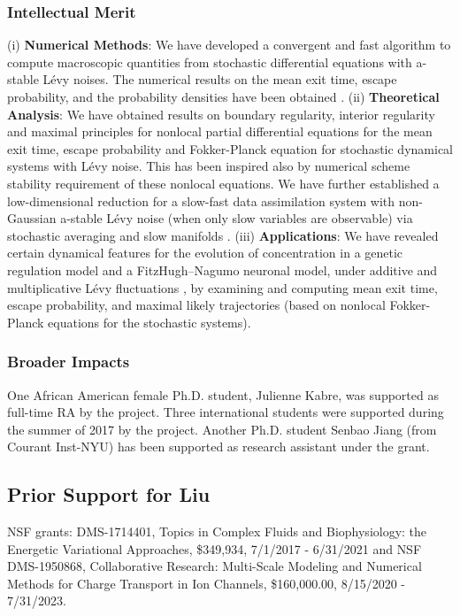 \documentclass[11pt]{NSFamsart}
\begin{document}
\subsubsection*{Intellectual Merit}
(i)  \textbf{Numerical Methods}:
    We have developed a convergent and fast algorithm to compute macroscopic quantities from stochastic differential equations  with a-stable L\'evy noises. The numerical results on the mean   exit time, escape probability,  and the probability densities have been obtained \cite{ChenXL2020, GaoTing2016, Gao2016,     Wang2018NumericalAF}.
(ii)  \textbf{Theoretical Analysis}:
We have obtained results on  boundary regularity, interior regularity and maximal principles for   nonlocal partial differential equations for the mean   exit time,   escape probability and Fokker-Planck equation for stochastic dynamical systems with L\'evy noise. This has been inspired also by numerical scheme stability requirement of these nonlocal equations. We have further established a  low-dimensional reduction for a slow-fast data assimilation system with non-Gaussian a-stable L\'evy noise (when only slow variables are observable) via stochastic averaging and slow manifolds \cite{Lv2016OnAS,QiaoDuan2018,   ZhangZhuanDuan,ZhengDuan2017,ZhengYY2020}.
(iii)   \textbf{Applications}:
   We have revealed certain  dynamical features  for  the evolution of concentration in a genetic regulation model \cite{ChenWu} and a
   FitzHugh–Nagumo   neuronal model,   under additive and multiplicative     L\'evy fluctuations \cite{Liu2019LvyNI}, by examining and computing mean exit time, escape probability, and maximal likely trajectories (based on nonlocal Fokker-Planck equations for the stochastic systems).


 \subsubsection*{Broader Impacts}
 One African American female Ph.D. student, Julienne Kabre, was supported as full-time RA by the project. Three international students were supported during the summer of 2017 by the project.    Another Ph.D. student Senbao Jiang (from Courant Inst-NYU)  has been supported as research assistant under the grant. 
 
 

\subsection*{Prior Support for Liu} NSF grants: DMS-1714401,  Topics in Complex Fluids and Biophysiology: the Energetic Variational Approaches, \$349,934, 7/1/2017 - 6/31/2021 and 
{NSF DMS-1950868, Collaborative Research: Multi-Scale Modeling and Numerical Methods for Charge Transport in Ion Channels, \$160,000.00, 8/15/2020 - 7/31/2023.}
\end{document}

